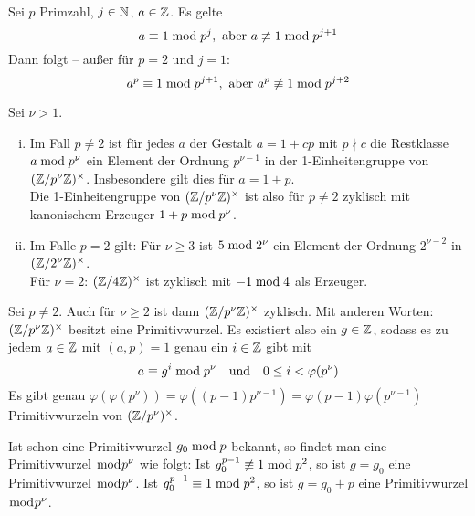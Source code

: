 \begin{lemma} \label{lemma_4.2}
	Sei $p$ Primzahl, $j \in \mathbb{N}$, $a \in \mathbb{Z}$. Es gelte
	\begin{equation}
		a \equiv 1 \bmod p^j, \text{ aber } a \not\equiv 1 \bmod p^{j+1} \label{eq_lemma_4.2_1}
	\end{equation}
	Dann folgt -- außer für $p=2$ und $j = 1$:
	\begin{equation}
		a^p \equiv 1 \bmod p^{j+1}, \text{ aber } a^p \not\equiv 1 \bmod p^{j+2} \label{eq_lemma_4.2_2}
	\end{equation}
\end{lemma}

\begin{falko} \label{F4.4}
	Sei $\nu > 1$. \begin{enumerate}[(i)]
		\item Im Fall $p \neq 2$ ist für jedes $a$ der Gestalt $a = 1+cp$ mit $p \nmid c$ die Restklasse $a \bmod p^\nu$ ein Element der Ordnung $p^{\nu - 1}$ in der 1-Einheitengruppe von $(\mathbb{Z}/p^\nu\mathbb{Z})^\times$. Insbesondere gilt dies für $a = 1+p$. \\
		Die 1-Einheitengruppe von $(\mathbb{Z}/p^\nu\mathbb{Z})^\times$ ist also für $p \neq 2$ zyklisch mit kanonischem Erzeuger $1+p \bmod p^\nu$.
		\item Im Falle $p=2$ gilt: Für $\nu \geq 3$ ist $5 \bmod 2^\nu$ ein Element der Ordnung $2^{\nu-2}$ in $(\mathbb{Z}/2^\nu\mathbb{Z})^\times$. \\
		Für $\nu=2$: $(\mathbb{Z}/4\mathbb{Z})^\times$ ist zyklisch mit $-1 \bmod 4$ als Erzeuger.
	\end{enumerate}
\end{falko}

\begin{satz} \label{satz_4.2}
	Sei $p \neq 2$. Auch für $\nu \geq 2$ ist dann $(\mathbb{Z}/p^\nu\mathbb{Z})^\times$ zyklisch. Mit anderen Worten: $(\mathbb{Z}/p^\nu\mathbb{Z})^\times$ besitzt eine Primitivwurzel. Es existiert also ein $g \in \mathbb{Z}$, sodass es zu jedem $a \in \mathbb{Z}$ mit $(a,p) = 1$ genau ein $i \in \mathbb{Z}$ gibt mit
	\[ a \equiv g^i \bmod p^\nu \quad \text{und} \quad 0 \leq i < \varphi(p^\nu) \]
	Es gibt genau $\varphi(\varphi(p^\nu)) = \varphi((p-1)p^{\nu-1}) = \varphi(p-1) \varphi(p^{\nu-1})$ Primitivwurzeln von $(\mathbb{Z}/p^\nu)^\times$.
\end{satz}

	Ist schon eine Primitivwurzel $g_0 \bmod p$ bekannt, so findet man eine Primitivwurzel $\bmod p^\nu$ wie folgt: Ist $g_0^{p-1} \not\equiv 1 \bmod p^2$, so ist $g = g_0$ eine Primitivwurzel $\bmod p^\nu$. Ist $g_0^{p-1} \equiv 1 \bmod p^2$, so ist $g = g_0 + p$ eine Primitivwurzel $\bmod p^\nu$.
	
